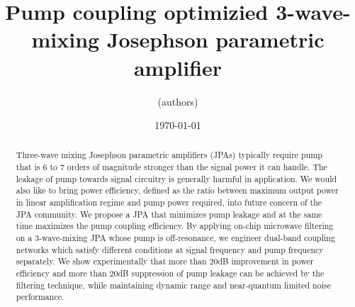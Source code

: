 \documentclass[aip,reprint]{revtex4-2}
\begin{document}

\title[Pump coupling optimizied 3-wave-mixing Josephson parametric amplifier]{Pump coupling optimizied 3-wave-mixing Josephson parametric amplifier} %



\author{(authors)}


\date{\today}

\begin{abstract}

Three-wave mixing Josephson parametric amplifiers (JPAs) typically require pump that is 6 to 7 orders of magnitude stronger than the signal power it can handle. The leakage of pump towards signal circuitry is generally harmful in application. We would also like to bring power efficiency, defined as the ratio between maximum output power in linear amplification regime and pump power required, into future concern of the JPA community. We propose a JPA that minimizes pump leakage and at the same time maximizes the pump coupling efficiency. By applying on-chip microwave filtering on a 3-wave-mixing JPA whose pump is off-resonance, we engineer dual-band coupling networks which satisfy different conditions at signal frequency and pump frequency separately. We show experimentally that more than 20dB improvement in power efficiency and more than 20dB suppression of pump leakage can be achieved by the filtering technique, while maintaining dynamic range and near-quantum limited noise performance. 

\end{abstract}
\end{document}
